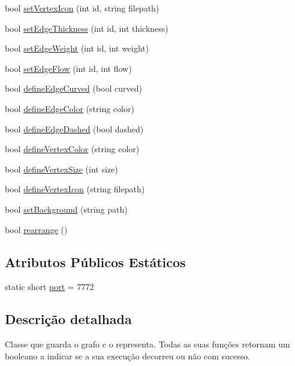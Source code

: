 \begin{DoxyCompactItemize}
bool \hyperlink{class_graph_viewer_a02d5f7393eab9a2d1b66719039597a64}{set\+Vertex\+Icon} (int id, string filepath)
\item 
bool \hyperlink{class_graph_viewer_a07f598272fe3515455eab13be749604a}{set\+Edge\+Thickness} (int id, int thickness)
\item 
bool \hyperlink{class_graph_viewer_ac211de009a0afe2e6d44f4f8d030a2cc}{set\+Edge\+Weight} (int id, int weight)
\item 
bool \hyperlink{class_graph_viewer_a69eb065145063e4dea41961e92e35c8e}{set\+Edge\+Flow} (int id, int flow)
\item 
bool \hyperlink{class_graph_viewer_a08f362be0e682d91e7506dca8caae1b8}{define\+Edge\+Curved} (bool curved)
\item 
bool \hyperlink{class_graph_viewer_a4102580b69826ba83251ef7bb262f8be}{define\+Edge\+Color} (string color)
\item 
bool \hyperlink{class_graph_viewer_af785279b5c204df0e274b20c36276fc3}{define\+Edge\+Dashed} (bool dashed)
\item 
bool \hyperlink{class_graph_viewer_a76de8676b7a93d72af514b84cdaa4d21}{define\+Vertex\+Color} (string color)
\item 
bool \hyperlink{class_graph_viewer_ac4b2a9fec74d38e64088aa79ca4b7d9b}{define\+Vertex\+Size} (int size)
\item 
bool \hyperlink{class_graph_viewer_af1adb6a361457187a820e01dcf0a34b7}{define\+Vertex\+Icon} (string filepath)
\item 
bool \hyperlink{class_graph_viewer_a02437b5fecd8b90de24436068312d593}{set\+Background} (string path)
\item 
bool \hyperlink{class_graph_viewer_a3009a66958686ccb7e78b68e37c3c423}{rearrange} ()
\end{DoxyCompactItemize}
\subsection*{Atributos Públicos Estáticos}
\begin{DoxyCompactItemize}
\item 
static short \hyperlink{class_graph_viewer_a89d0abe75f41feededc49497cc514342}{port} = 7772
\end{DoxyCompactItemize}


\subsection{Descrição detalhada}
Classe que guarda o grafo e o representa. Todas as suas funções retornam um booleano a indicar se a sua execução decorreu ou não com sucesso. 

